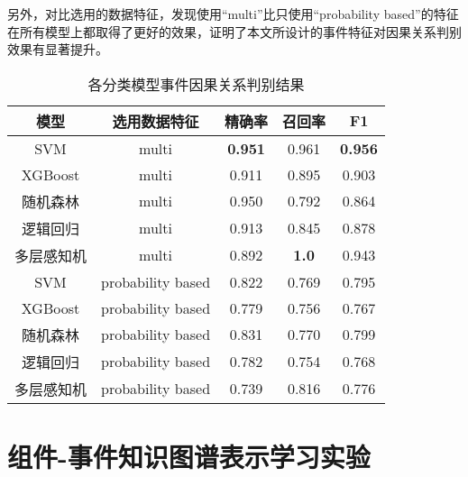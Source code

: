 另外，对比选用的数据特征，发现使用“multi”比只使用“probability based”的特征在所有模型上都取得了更好的效果，证明了本文所设计的事件特征对因果关系判别效果有显著提升。
\begin{table}[htbp]
    \caption{各分类模型事件因果关系判别结果}
    \centering
    \label{cause-relation-result}
    \begin{tabular}{ccccc}
    \toprule
    模型      & 选用数据特征              & 精确率            & 召回率                           & F1             \\ \midrule
    SVM     & multi               & \textbf{0.951} & 0.961                         & \textbf{0.956} \\
    XGBoost & multi               & 0.911          & 0.895                         & 0.903          \\
    随机森林    & multi               & 0.950          & 0.792                         & 0.864          \\
    逻辑回归    & multi               & 0.913          & 0.845                         & 0.878          \\
    多层感知机   & multi               & 0.892          & \textbf{1.0}                  & 0.943          \\ \midrule
    SVM     & probability based & 0.822          & 0.769                         & 0.795          \\
    XGBoost & probability based & 0.779          & 0.756                         & 0.767          \\
    随机森林    & probability based & 0.831          & 0.770                         & 0.799          \\
    逻辑回归    & probability based & 0.782          & 0.754                         & 0.768          \\
    多层感知机   & probability based & 0.739          & 0.816  & 0.776          \\ \bottomrule
    \end{tabular}
\end{table}

\section{组件-事件知识图谱表示学习实验}
